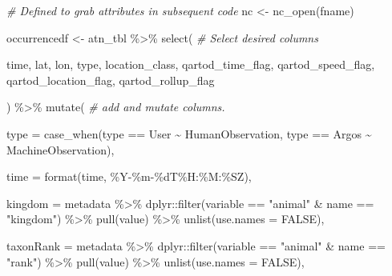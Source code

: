 \documentclass[
]{book}
\newenvironment{Shaded}{\begin{snugshade}}{\end{snugshade}}
\newcommand{\AttributeTok}[1]{\textcolor[rgb]{0.77,0.63,0.00}{#1}}
\newcommand{\CommentTok}[1]{\textcolor[rgb]{0.56,0.35,0.01}{\textit{#1}}}
\newcommand{\ConstantTok}[1]{\textcolor[rgb]{0.00,0.00,0.00}{#1}}
\newcommand{\FunctionTok}[1]{\textcolor[rgb]{0.00,0.00,0.00}{#1}}
\newcommand{\NormalTok}[1]{#1}
\newcommand{\OtherTok}[1]{\textcolor[rgb]{0.56,0.35,0.01}{#1}}
\newcommand{\SpecialCharTok}[1]{\textcolor[rgb]{0.00,0.00,0.00}{#1}}
\newcommand{\StringTok}[1]{\textcolor[rgb]{0.31,0.60,0.02}{#1}}
\begin{document}
\begin{Shaded}
\begin{Highlighting}[]
\CommentTok{\# Defined to grab attributes in subsequent code}
\NormalTok{nc }\OtherTok{\textless{}{-}} \FunctionTok{nc\_open}\NormalTok{(fname)}

\NormalTok{occurrencedf }\OtherTok{\textless{}{-}}\NormalTok{ atn\_tbl }\SpecialCharTok{\%\textgreater{}\%}  
    \FunctionTok{select}\NormalTok{( }\CommentTok{\# Select desired columns}
        
\NormalTok{        time, }
\NormalTok{        lat,}
\NormalTok{        lon,}
\NormalTok{        type,}
\NormalTok{        location\_class,}
\NormalTok{        qartod\_time\_flag,}
\NormalTok{        qartod\_speed\_flag,}
\NormalTok{        qartod\_location\_flag,}
\NormalTok{        qartod\_rollup\_flag}
        
\NormalTok{          ) }\SpecialCharTok{\%\textgreater{}\%}
    \FunctionTok{mutate}\NormalTok{( }\CommentTok{\# add and mutate columns.}
        
        \AttributeTok{type =} \FunctionTok{case\_when}\NormalTok{(type }\SpecialCharTok{==} \StringTok{\textquotesingle{}User\textquotesingle{}} \SpecialCharTok{\textasciitilde{}} \StringTok{\textquotesingle{}HumanObservation\textquotesingle{}}\NormalTok{,}
\NormalTok{                         type }\SpecialCharTok{==} \StringTok{\textquotesingle{}Argos\textquotesingle{}} \SpecialCharTok{\textasciitilde{}} \StringTok{\textquotesingle{}MachineObservation\textquotesingle{}}\NormalTok{),}
        
        \AttributeTok{time =} \FunctionTok{format}\NormalTok{(time, }\StringTok{\textquotesingle{}\%Y{-}\%m{-}\%dT\%H:\%M:\%SZ\textquotesingle{}}\NormalTok{),}
        
        \AttributeTok{kingdom =}\NormalTok{ metadata }\SpecialCharTok{\%\textgreater{}\%}\NormalTok{ dplyr}\SpecialCharTok{::}\FunctionTok{filter}\NormalTok{(variable }\SpecialCharTok{==} \StringTok{"animal"} \SpecialCharTok{\&}\NormalTok{ name }\SpecialCharTok{==} \StringTok{"kingdom"}\NormalTok{) }\SpecialCharTok{\%\textgreater{}\%} \FunctionTok{pull}\NormalTok{(value) }\SpecialCharTok{\%\textgreater{}\%} \FunctionTok{unlist}\NormalTok{(}\AttributeTok{use.names =} \ConstantTok{FALSE}\NormalTok{),}
        
        \AttributeTok{taxonRank =}\NormalTok{ metadata }\SpecialCharTok{\%\textgreater{}\%}\NormalTok{ dplyr}\SpecialCharTok{::}\FunctionTok{filter}\NormalTok{(variable }\SpecialCharTok{==} \StringTok{"animal"} \SpecialCharTok{\&}\NormalTok{ name }\SpecialCharTok{==} \StringTok{"rank"}\NormalTok{) }\SpecialCharTok{\%\textgreater{}\%} \FunctionTok{pull}\NormalTok{(value) }\SpecialCharTok{\%\textgreater{}\%} \FunctionTok{unlist}\NormalTok{(}\AttributeTok{use.names =} \ConstantTok{FALSE}\NormalTok{),}
        

\end{Highlighting}
\end{Shaded}
\end{document}

